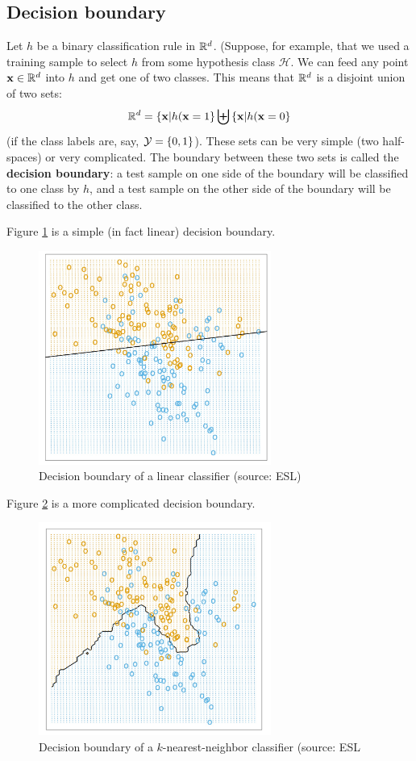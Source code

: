 \documentclass[11pt]{article}
\newcommand{\Hc}{\mathcal{H}}
\newcommand{\VV}[1]{\mathbf{#1}}
\begin{document}
    \subsection{Decision boundary}
    
    Let $h$ be a binary classification rule in $\mathbb{R}^d$. (Suppose, for example, that
      we used a training sample to select $h$ from some hypothesis class $\Hc$. 
      We can feed any point $\VV{x}\in\reals^d$ into $h$ and get one of two
      classes. This means that $\mathbb{R}^d$ is a disjoint union of two sets:
      \[
	\reals^d = \left\{ \VV{x}|h(\VV{x}=1 \right\} \biguplus \left\{
	    \VV{x}|h(\VV{x}=0 \right\}  
      \]
      (if the class labels are, say, $\mathcal{Y}= \left\{ 0,1 \right\}$).
      These sets can be very simple (two half-spaces) or very complicated.
      The boundary between these two sets is called the {\bf decision boundary}: 
      a test sample on one side of the boundary will be classified to one class
      by $h$, and a test sample on the other side of the boundary will be
      classified to the other class. 


      Figure \ref{b1} is a simple (in fact linear) decision boundary.
      \begin{figure}[h!]
      \centering
      \includegraphics[width=3in]{b1.pdf}
      \caption{Decision boundary of a linear classifier (source: ESL)}
      \label{b1}
    \end{figure}

    Figure \ref{b2} is a more complicated decision boundary.

    \begin{figure}[h!]
      \centering
      \includegraphics[width=3in]{b2.pdf}
      \caption{Decision boundary of a $k$-nearest-neighbor classifier (source:
	ESL}
	\label{b2}
    \end{figure}
\end{document}
